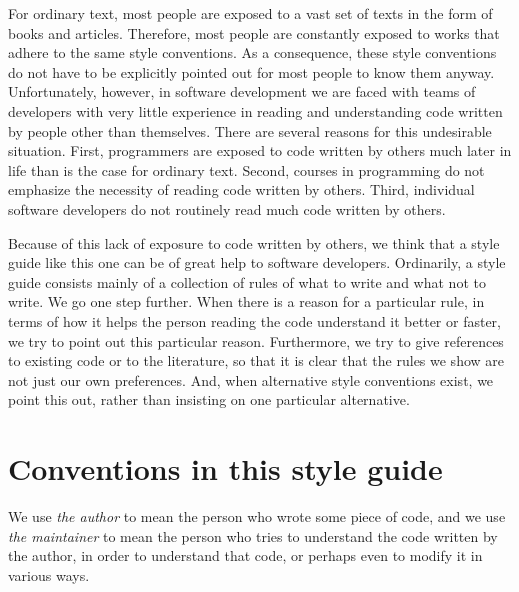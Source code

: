 For ordinary text, most people are exposed to a vast set of texts in
the form of books and articles.  Therefore, most people are constantly
exposed to works that adhere to the same style conventions.  As a
consequence, these style conventions do not have to be explicitly
pointed out for most people to know them anyway.  Unfortunately,
however, in software development we are faced with teams of developers
with very little experience in reading and understanding code written
by people other than themselves.  There are several reasons for this
undesirable situation.  First, programmers are exposed to code written
by others much later in life than is the case for ordinary text.
Second, courses in programming do not emphasize the necessity of
reading code written by others.  Third, individual software developers
do not routinely read much code written by others.

Because of this lack of exposure to code written by others, we think
that a style guide like this one can be of great help to software
developers.  Ordinarily, a style guide consists mainly of a collection
of rules of what to write and what not to write.  We go one step
further.  When there is a reason for a particular rule, in terms of
how it helps the person reading the code understand it better or
faster, we try to point out this particular reason.  Furthermore, we
try to give references to existing code or to the literature, so that
it is clear that the rules we show are not just our own preferences.
And, when alternative style conventions exist, we point this out,
rather than insisting on one particular alternative.

\section{Conventions in this style guide}

We use \emph{the author} to mean the person who wrote some piece of
code, and we use \emph{the maintainer} to mean the person who tries to
understand the code written by the author, in order to understand that
code, or perhaps even to modify it in various ways.
